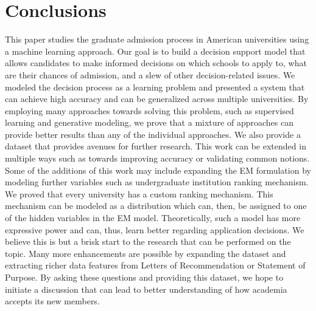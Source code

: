 \documentclass{sig-alternate-05-2015}
\begin{document}
\section{Conclusions}
\label{sec:conclusions}
This paper studies the graduate admission process in American universities using a machine learning approach. Our goal is to build a decision support model that allows candidates to make informed decisions on which schools to apply to, what are their chances of admission, and a slew of other decision-related issues. We modeled the decision process as a learning problem and presented a system that can achieve high accuracy and can be generalized across multiple universities. By employing many approaches towards solving this problem, such as supervised learning and generative modeling, we prove that a mixture of approaches can provide better results than any of the individual approaches. We also provide a dataset that provides avenues for further research. This work can be extended in multiple ways such as towards improving accuracy or validating common notions. Some of the additions of this work may include expanding the EM formulation by modeling further variables such as undergraduate institution ranking mechanism. We proved that every university has a custom ranking mechanism. This mechanism can be modeled as a distribution which can, then, be assigned to one of the hidden variables in the EM model. Theoretically, such a model has more expressive power and can, thus, learn better regarding application decisions. We believe this is but a brisk start to the research that can be performed on the topic. Many more enhancements are possible by expanding the dataset and extracting richer data features from Letters of Recommendation or Statement of Purpose. By asking these questions and providing this dataset, we hope to initiate a discussion that can lead to better understanding of how academia accepts its new members.


%

%
%
\end{document}
